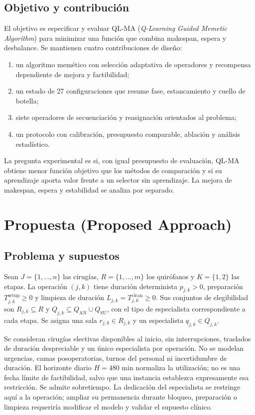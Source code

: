 \documentclass[11pt,a4paper]{article}
\begin{document}
\subsection*{Objetivo y contribución}
El objetivo es especificar y evaluar QL-MA (\emph{Q-Learning Guided Memetic Algorithm}) para minimizar una función que combina makespan, espera y desbalance. Se mantienen cuatro contribuciones de diseño:
\begin{enumerate}
\item un algoritmo memético con selección adaptativa de operadores y recompensa dependiente de mejora y factibilidad;
\item un estado de 27 configuraciones que resume fase, estancamiento y cuello de botella;
\item siete operadores de secuenciación y reasignación orientados al problema;
\item un protocolo con calibración, presupuesto comparable, ablación y análisis estadístico.
\end{enumerate}
La pregunta experimental es si, con igual presupuesto de evaluación, QL-MA obtiene menor función objetivo que los métodos de comparación y si su aprendizaje aporta valor frente a un selector sin aprendizaje. La mejora de makespan, espera y estabilidad se analiza por separado.

\section{Propuesta (Proposed Approach)}
\subsection{Problema y supuestos}
Sean $J=\{1,\ldots,n\}$ las cirugías, $R=\{1,\ldots,m\}$ los quirófanos y $K=\{1,2\}$ las etapas. La operación $(j,k)$ tiene duración determinista $p_{j,k}>0$, preparación $T^{\mathrm{setup}}_{j,k}\geq0$ y limpieza de duración $L_{j,k}=T^{\mathrm{clean}}_{j,k}\geq0$. Sus conjuntos de elegibilidad son $R_{j,k}\subseteq R$ y $Q_{j,k}\subseteq Q_{\mathrm{AN}}\cup Q_{\mathrm{SU}}$, con el tipo de especialista correspondiente a cada etapa. Se asigna una sala $r_{j,k}\in R_{j,k}$ y un especialista $q_{j,k}\in Q_{j,k}$.

Se consideran cirugías electivas disponibles al inicio, sin interrupciones, traslados de duración despreciable y un único especialista por operación. No se modelan urgencias, camas posoperatorias, turnos del personal ni incertidumbre de duración. El horizonte diario $H=480$ min normaliza la utilización; no es una fecha límite de factibilidad, salvo que una instancia establezca expresamente esa restricción. Se admite sobretiempo. La dedicación del especialista se restringe aquí a la operación; ampliar su permanencia durante bloqueo, preparación o limpieza requeriría modificar el modelo y validar el supuesto clínico.
\end{document}

